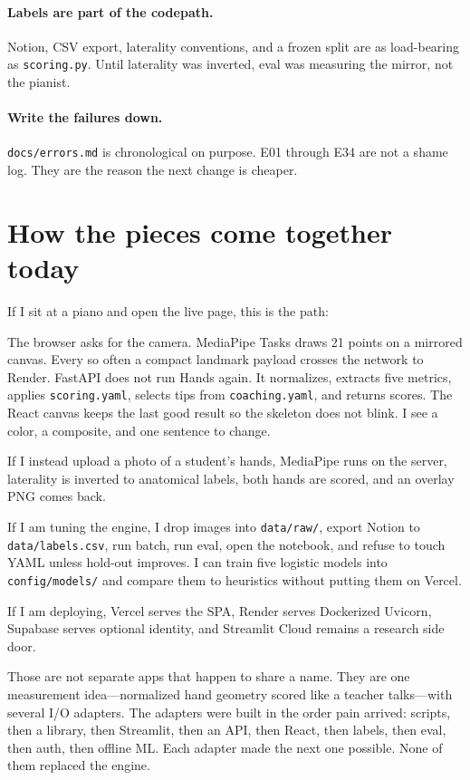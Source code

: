 \documentclass[11pt,a4paper]{article}
\newcommand{\code}[1]{\texttt{#1}}
\begin{document}
\paragraph{Labels are part of the codepath.}
Notion, CSV export, laterality conventions, and a frozen split are as load-bearing as \code{scoring.py}.
Until laterality was inverted, eval was measuring the mirror, not the pianist.

\paragraph{Write the failures down.}
\code{docs/errors.md} is chronological on purpose.
E01 through E34 are not a shame log.
They are the reason the next change is cheaper.

\section{How the pieces come together today}
\label{sec:together}

If I sit at a piano and open the live page, this is the path:

The browser asks for the camera.
MediaPipe Tasks draws 21 points on a mirrored canvas.
Every so often a compact landmark payload crosses the network to Render.
FastAPI does not run Hands again.
It normalizes, extracts five metrics, applies \code{scoring.yaml}, selects tips from \code{coaching.yaml}, and returns scores.
The React canvas keeps the last good result so the skeleton does not blink.
I see a color, a composite, and one sentence to change.

If I instead upload a photo of a student's hands, MediaPipe runs on the server, laterality is inverted to anatomical labels, both hands are scored, and an overlay PNG comes back.

If I am tuning the engine, I drop images into \code{data/raw/}, export Notion to \code{data/labels.csv}, run batch, run eval, open the notebook, and refuse to touch YAML unless hold-out improves.
I can train five logistic models into \code{config/models/} and compare them to heuristics without putting them on Vercel.

If I am deploying, Vercel serves the SPA, Render serves Dockerized Uvicorn, Supabase serves optional identity, and Streamlit Cloud remains a research side door.

Those are not separate apps that happen to share a name.
They are one measurement idea---normalized hand geometry scored like a teacher talks---with several I/O adapters.
The adapters were built in the order pain arrived: scripts, then a library, then Streamlit, then an API, then React, then labels, then eval, then auth, then offline ML.
Each adapter made the next one possible.
None of them replaced the engine.
\end{document}
